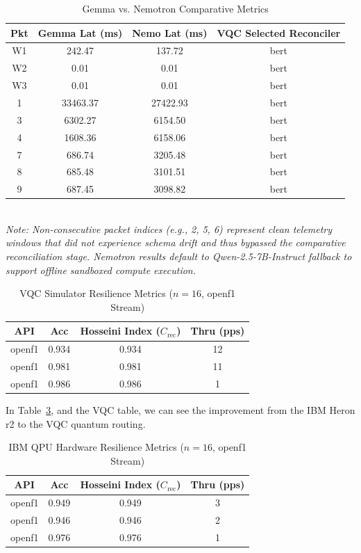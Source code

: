 \documentclass[11pt]{article}
\begin{document}
\begin{table}[H]
\centering
\small
\caption{Gemma vs. Nemotron Comparative Metrics}
\label{tab:gemma_vs_nemotron}
\begin{tabular}{cccc}
\toprule
Pkt & Gemma Lat (ms) & Nemo Lat (ms) & VQC Selected Reconciler \\ \midrule
W1 & 242.47 & 137.72 & bert \\
W2 & 0.01 & 0.01 & bert \\
W3 & 0.01 & 0.01 & bert \\
1 & 33463.37 & 27422.93 & bert \\
3 & 6302.27 & 6154.50 & bert \\
4 & 1608.36 & 6158.06 & bert \\
7 & 686.74 & 3205.48 & bert \\
8 & 685.48 & 3101.51 & bert \\
9 & 687.45 & 3098.82 & bert \\ \bottomrule
\end{tabular}
\\ \small{\textit{Note: Non-consecutive packet indices (e.g., 2, 5, 6) represent clean telemetry windows that did not experience schema drift and thus bypassed the comparative reconciliation stage. Nemotron results default to Qwen-2.5-7B-Instruct fallback to support offline sandboxed compute execution.}}
\end{table}

\begin{table}[H]
\centering
\small
\caption{VQC Simulator Resilience Metrics ($n=16$, openf1 Stream)}
\label{tab:vqc_sim_resilience}
\begin{tabular}{cccc}
\toprule
API & Acc & Hosseini Index ($C_{\text{rec}}$) & Thru (pps) \\ \midrule
openf1 & 0.934 & 0.934 & 12 \\
openf1 & 0.981 & 0.981 & 11 \\
openf1 & 0.986 & 0.986 & 1 \\ \bottomrule
\end{tabular}
\end{table}

In Table~\ref{tab:qpu_hw_resilience}, and the VQC table, we can see the improvement from the IBM Heron r2 to the VQC quantum routing.

\begin{table}[H]
\centering
\small
\caption{IBM QPU Hardware Resilience Metrics ($n=16$, openf1 Stream)}
\label{tab:qpu_hw_resilience}
\begin{tabular}{cccc}
\toprule
API & Acc & Hosseini Index ($C_{\text{rec}}$) & Thru (pps) \\ \midrule
openf1 & 0.949 & 0.949 & 3 \\
openf1 & 0.946 & 0.946 & 2 \\
openf1 & 0.976 & 0.976 & 1 \\ \bottomrule
\end{tabular}
\end{table}
\end{document}

